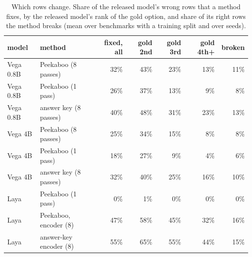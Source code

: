 \begin{table}[tbp]\centering\small
\caption{Which rows change. Share of the released model's wrong rows that a method fixes, by the released model's rank of the gold option, and share of its right rows the method breaks (mean over benchmarks with a training split and over seeds).}
\label{tab:fixbreak}
\begin{tabular}{llrrrrr}
\toprule
model & method & fixed, all & gold 2nd & gold 3rd & gold 4th+ & broken \\
\midrule
Vega 0.8B & Peekaboo (8 passes) & 32\% & 43\% & 23\% & 13\% & 11\% \\
Vega 0.8B & Peekaboo (1 pass) & 26\% & 37\% & 13\% & 9\% & 8\% \\
Vega 0.8B & answer key (8 passes) & 40\% & 48\% & 31\% & 23\% & 13\% \\
Vega 4B & Peekaboo (8 passes) & 25\% & 34\% & 15\% & 8\% & 8\% \\
Vega 4B & Peekaboo (1 pass) & 18\% & 27\% & 9\% & 4\% & 6\% \\
Vega 4B & answer key (8 passes) & 32\% & 40\% & 25\% & 16\% & 10\% \\
Laya & Peekaboo (1 pass) & 0\% & 1\% & 0\% & 0\% & 0\% \\
Laya & Peekaboo, encoder (8) & 47\% & 58\% & 45\% & 32\% & 16\% \\
Laya & answer-key encoder (8) & 55\% & 65\% & 55\% & 44\% & 15\% \\
\bottomrule
\end{tabular}
\end{table}
